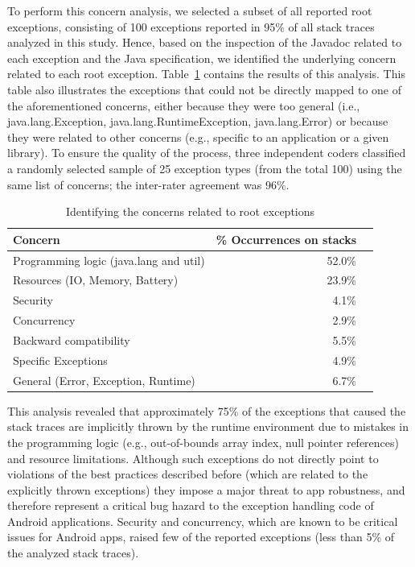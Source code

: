 To perform this concern analysis, we selected a subset of all reported
root exceptions, consisting of 100 exceptions
reported in 95\% of all stack traces analyzed in this study. Hence, based on the inspection of the
Javadoc related to each exception and the Java specification, we
identified the underlying concern related to each root exception. Table~\ref{tab:tophundrend} contains the results of this analysis. This table also illustrates the exceptions
that could not be directly mapped to one of the aforementioned concerns, either because they were too general (i.e., java.lang.Exception,
java.lang.RuntimeException, java.lang.Error) or because they were
related to other concerns (e.g., specific to an application or a given library).
To ensure the quality of the process, three independent coders classified a randomly selected
sample of 25 exception types (from the total 100) using the same list of concerns;
the inter-rater agreement was 96\%.

\begin{table}
\scriptsize
\centering
\begin{tabular}{lrr}
\hline
\bfseries{Concern} & \bfseries{\% Occurrences on stacks} \\
\hline
Programming logic (java.lang and util) & 52.0\%\\
Resources (IO, Memory, Battery) & 23.9\% \\
Security & 4.1\%\\
Concurrency & 2.9\% \\
Backward compatibility & 5.5\% \\
Specific Exceptions & 4.9\%\\
General (Error, Exception, Runtime) & 6.7\%\\
\hline
\end{tabular}
\caption{Identifying the concerns related to root exceptions}
\label{tab:tophundrend}
\end{table}

This analysis revealed that approximately 75\% of the exceptions
 that caused the stack traces are implicitly thrown by the runtime
environment  due to mistakes in the programming logic (e.g., out-of-bounds array index, null pointer
references) and resource limitations. Although such exceptions do not directly point to violations of
the best practices described before (which are related to the
explicitly thrown exceptions) they impose a major threat to app robustness,
and therefore represent a critical bug hazard to the exception
handling code of Android applications.
Security and concurrency, which are known to be critical issues for Android apps,
raised few of the reported exceptions (less than 5\% of the analyzed stack traces).

